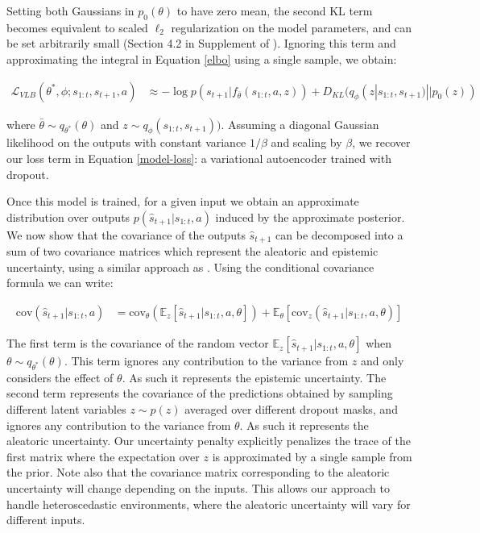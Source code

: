 \documentclass{article} %
\begin{document}
Setting both Gaussians in $p_0(\theta)$ to have zero mean, the second KL term becomes equivalent to scaled $\ell_2$ regularization on the model parameters, and can be set arbitrarily small (Section 4.2 in Supplement of \citep{Gal16}). 
Ignoring this term and approximating the integral in Equation \ref{elbo} using a single sample, we obtain:

\begin{align*}
  \mathcal{L}_{VLB}(\theta^*, \phi; s_{1:t}, s_{t+1}, a) &\approx -\log p(s_{t+1} | f_{\bar{\theta}}(s_{1:t}, a, z)) + D_{KL}(q_\phi(z | s_{1:t}, s_{t+1}) || p_0(z)) 
\end{align*}

where $\bar{\theta} \sim q_{\theta^*}(\theta)$ and $z \sim q_\phi(s_{1:t}, s_{t+1}))$. Assuming a diagonal Gaussian likelihood on the outputs with constant variance $1/\beta$ and scaling by $\beta$, we recover our loss term in Equation \ref{model-loss}: a variational autoencoder trained with dropout. 

Once this model is trained, for a given input we obtain an approximate distribution over outputs $p(\hat{s}_{t+1} | s_{1:t}, a)$ induced by the approximate posterior.
We now show that the covariance of the outputs $\hat{s}_{t+1}$ can be decomposed into a sum of two covariance matrices which represent the aleatoric and epistemic uncertainty, using a similar approach as \citep{depeweg18}. 
Using the conditional covariance formula we can write:

\begin{align}
  \mbox{cov}(\hat{s}_{t+1} | s_{1:t}, a) &= \mbox{cov}_\theta(\mathbb{E}_z[\hat{s}_{t+1} | s_{1:t}, a, \theta]) + \mathbb{E}_\theta[\mbox{cov}_z(\hat{s}_{t+1} | s_{1:t}, a, \theta)]
\end{align}

The first term is the covariance of the random vector $\mathbb{E}_z[\hat{s}_{t+1} | s_{1:t}, a, \theta]$ when $\theta \sim q_{\theta^*}(\theta)$.
This term ignores any contribution to the variance from $z$ and only considers the effect of $\theta$. As such it represents the epistemic uncertainty.
The second term represents the covariance of the predictions obtained by sampling different latent variables $z \sim p(z)$ averaged over different dropout masks, and ignores any contribution to the variance from $\theta$. As such it represents the aleatoric uncertainty.
Our uncertainty penalty explicitly penalizes the trace of the first matrix where the expectation over $z$ is approximated by a single sample from the prior.
Note also that the covariance matrix corresponding to the aleatoric uncertainty will change depending on the inputs. This allows our approach to handle heteroscedastic environments, where the aleatoric uncertainty will vary for different inputs.
\end{document}
